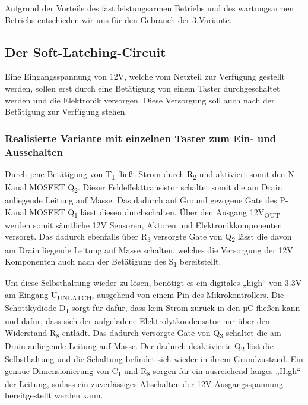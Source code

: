 Aufgrund der Vorteile des fast leistungsarmen Betriebs und des wartungsarmen Betriebs entschieden wir uns für den Gebrauch der 3.Variante.

\newpage
\subsection{Der Soft-Latching-Circuit}

Eine Eingangsspannung von 12V, welche vom Netzteil zur Verfügung gestellt werden, sollen erst durch eine Betätigung von einem Taster durchgeschaltet werden und die Elektronik versorgen.
Diese Versorgung soll auch nach der Betätigung zur Verfügung stehen.

\subsubsection{Realisierte Variante mit einzelnen Taster zum Ein- und Ausschalten}

Durch jene Betätigung von T\textsubscript{1} fließt Strom durch R\textsubscript{2} und aktiviert somit den N-Kanal MOSFET Q\textsubscript{2}.
Dieser Feldeffekttransistor schaltet somit die am Drain anliegende Leitung auf Masse.
Das dadurch auf Ground gezogene Gate des P-Kanal MOSFET Q\textsubscript{1} lässt diesen durchschalten.
Über den Ausgang 12V\textsubscript{OUT} werden somit sämtliche 12V Sensoren, Aktoren und Elektronikkomponenten versorgt.
Das dadurch ebenfalls über R\textsubscript{3} versorgte Gate von Q\textsubscript{2} lässt die davon am Drain liegende Leitung auf Masse schalten,
welches die Versorgung der 12V Komponenten auch nach der Betätigung des S\textsubscript{1} bereitstellt.

Um diese Selbsthaltung wieder zu lösen, benötigt es ein digitales „high“ von 3.3V am Eingang U\textsubscript{UNLATCH}, ausgehend von einem Pin des Mikrokontrollers.
Die Schottkydiode D\textsubscript{1} sorgt für dafür, dass kein Strom zurück in den µC fließen kann und dafür, dass sich der aufgeladene
Elektrolytkondensator nur über den Widerstand R\textsubscript{8} entlädt.
Das dadurch versorgte Gate von Q\textsubscript{3} schaltet die am Drain anliegende Leitung auf Masse.
Der dadurch deaktivierte Q\textsubscript{2} löst die Selbsthaltung und die Schaltung befindet sich wieder in ihrem Grundzustand.
Ein genaue Dimensionierung von C\textsubscript{1} und R\textsubscript{8} sorgen für ein ausreichend langes „High“ der Leitung,
sodass ein zuverlässiges Abschalten der 12V Ausgangsspannung bereitgestellt werden kann. \\

